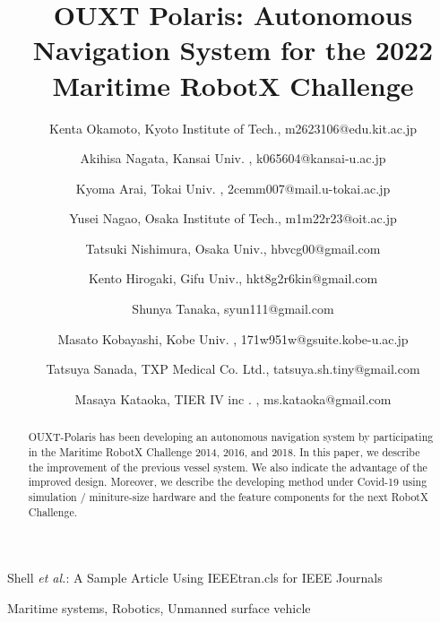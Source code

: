 \documentclass[lettersize,journal]{IEEEtran}
\begin{document}
\title{OUXT Polaris: Autonomous Navigation System for the 2022 Maritime RobotX Challenge}
\author{
    Kenta Okamoto, Kyoto Institute of Tech., m2623106@edu.kit.ac.jp \\ \and
    Akihisa Nagata, Kansai Univ. , k065604@kansai-u.ac.jp \\ \and
    Kyoma Arai, Tokai Univ. , 2cemm007@mail.u-tokai.ac.jp \\ \and
    Yusei Nagao, Osaka Institute of Tech., m1m22r23@oit.ac.jp \\ \and
    Tatsuki Nishimura, Osaka Univ., hbvcg00@gmail.com \\ \and
    Kento Hirogaki, Gifu Univ., hkt8g2r6kin@gmail.com \\ \and
    Shunya Tanaka, syun111@gmail.com \\ \and
    Masato Kobayashi, Kobe Univ. , 171w951w@gsuite.kobe-u.ac.jp \\ \and
    Tatsuya Sanada, TXP Medical Co. Ltd., tatsuya.sh.tiny@gmail.com \\ \and
    Masaya Kataoka, TIER IV inc . , ms.kataoka@gmail.com
}

%
{Shell \MakeLowercase{\textit{et al.}}: A Sample Article Using IEEEtran.cls for IEEE Journals}


\maketitle

\begin{abstract}
OUXT-Polaris has been developing an autonomous navigation system by participating in the 
Maritime RobotX Challenge 2014, 2016, and 2018. 
In this paper, we describe the improvement of the previous vessel system. 
We also indicate the advantage of the improved design.
Moreover, we describe the developing method under Covid-19 using simulation / miniture-size hardware and the 
feature components for the next RobotX Challenge.
\end{abstract}

\begin{IEEEkeywords}
Maritime systems, Robotics, Unmanned surface vehicle
\end{IEEEkeywords}
\end{document}

